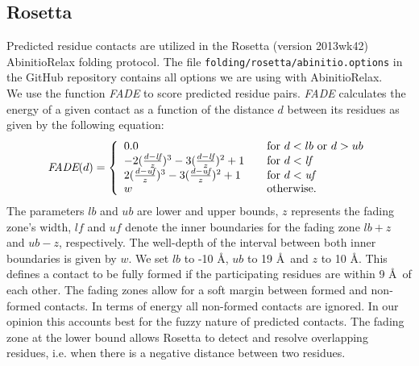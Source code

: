 \documentclass{bioinfo}
\begin{document}
\begin{methods}
\subsection{Rosetta}
Predicted residue contacts are utilized in the Rosetta (version 2013wk42) \cite[]{leaver-fay_rosetta3:_2011} AbinitioRelax folding protocol. The file {\tt folding/rosetta/abinitio.options} in the GitHub repository contains all options we are using with AbinitioRelax. \\\indent 
We use the function \emph{FADE} to score predicted residue pairs. \emph{FADE} calculates the energy of a given contact as a function of the distance $d$ between its residues as given by the following equation:
\begin{equation}%
    \textit{FADE}(d) = \left\{
    \begin{array}{l l l}\label{eq:fade}
        0.0 & \quad \textrm{for $d < lb$ or $d > ub$} \\
        -2(\frac{d - \textit{lf}}{z})^3 - 3(\frac{d - \textit{lf}}{z})^2 + 1 & \quad \textrm{for $d < \textit{lf}$} \\
        2(\frac{d - \textit{uf}}{z})^3 - 3(\frac{d - \textit{uf}}{z})^2 + 1 & \quad \textrm{for $d < \textit{uf}$} \\
        w & \quad \textrm{otherwise.} \\
    \end{array} \right.
\end{equation}
The parameters $lb$ and $ub$ are lower and upper bounds, $z$ represents the fading zone's width, $\textit{lf}$ and $\textit{uf}$ denote the inner boundaries for the fading zone $lb + z$ and $ub - z$, respectively. The well-depth of the interval between both inner boundaries is given by $w$. We set $lb$ to -10 \AA, $ub$ to 19 \AA\ and $z$ to 10 \AA. This defines a contact to be fully formed if the participating residues are within 9 \AA\ of each other. The fading zones allow for a soft margin between formed and non-formed contacts. In terms of energy all non-formed contacts are ignored. In our opinion this accounts best for the fuzzy nature of predicted contacts. The fading zone at the lower bound allows Rosetta to detect and resolve overlapping residues, i.e. when there is a negative distance between two residues.\\\indent


\end{methods}
\end{document}
